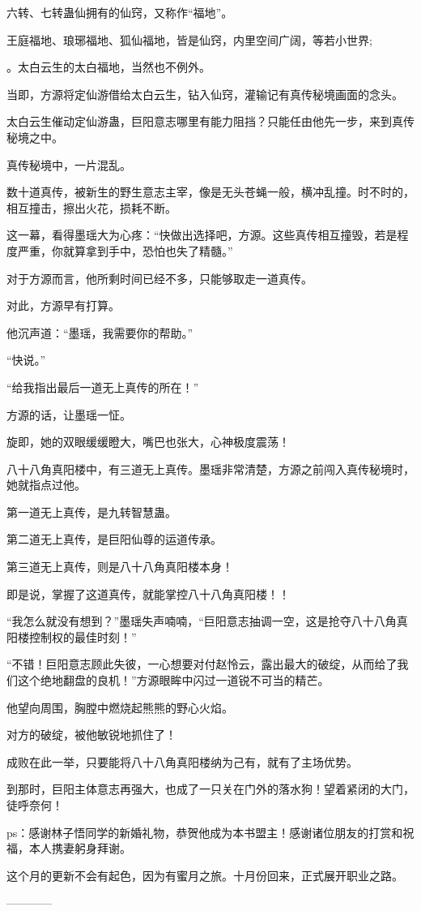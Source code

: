 \begin{this_body}
六转、七转蛊仙拥有的仙窍，又称作“福地”。

王庭福地、琅琊福地、狐仙福地，皆是仙窍，内里空间广阔，等若小世界;

。太白云生的太白福地，当然也不例外。

当即，方源将定仙游借给太白云生，钻入仙窍，灌输记有真传秘境画面的念头。

太白云生催动定仙游蛊，巨阳意志哪里有能力阻挡？只能任由他先一步，来到真传秘境之中。

真传秘境中，一片混乱。

数十道真传，被新生的野生意志主宰，像是无头苍蝇一般，横冲乱撞。时不时的，相互撞击，擦出火花，损耗不断。

这一幕，看得墨瑶大为心疼：“快做出选择吧，方源。这些真传相互撞毁，若是程度严重，你就算拿到手中，恐怕也失了精髓。”

对于方源而言，他所剩时间已经不多，只能够取走一道真传。

对此，方源早有打算。

他沉声道：“墨瑶，我需要你的帮助。”

“快说。”

“给我指出最后一道无上真传的所在！”

方源的话，让墨瑶一怔。

旋即，她的双眼缓缓瞪大，嘴巴也张大，心神极度震荡！

八十八角真阳楼中，有三道无上真传。墨瑶非常清楚，方源之前闯入真传秘境时，她就指点过他。

第一道无上真传，是九转智慧蛊。

第二道无上真传，是巨阳仙尊的运道传承。

第三道无上真传，则是八十八角真阳楼本身！

即是说，掌握了这道真传，就能掌控八十八角真阳楼！！

“我怎么就没有想到？”墨瑶失声喃喃，“巨阳意志抽调一空，这是抢夺八十八角真阳楼控制权的最佳时刻！”

“不错！巨阳意志顾此失彼，一心想要对付赵怜云，露出最大的破绽，从而给了我们这个绝地翻盘的良机！”方源眼眸中闪过一道锐不可当的精芒。

他望向周围，胸膛中燃烧起熊熊的野心火焰。

对方的破绽，被他敏锐地抓住了！

成败在此一举，只要能将八十八角真阳楼纳为己有，就有了主场优势。

到那时，巨阳主体意志再强大，也成了一只关在门外的落水狗！望着紧闭的大门，徒呼奈何！

ps：感谢林子悟同学的新婚礼物，恭贺他成为本书盟主！感谢诸位朋友的打赏和祝福，本人携妻躬身拜谢。

这个月的更新不会有起色，因为有蜜月之旅。十月份回来，正式展开职业之路。

------------

\end{this_body}

